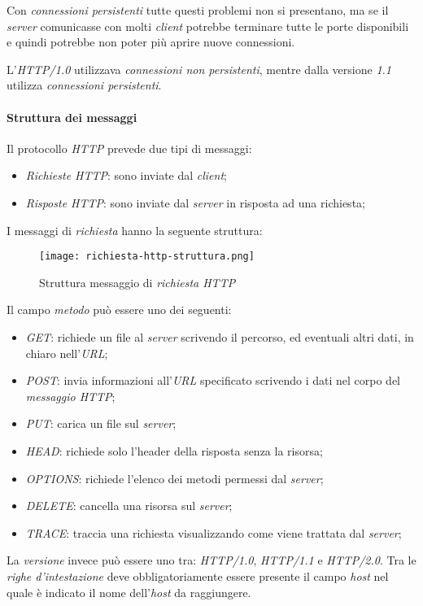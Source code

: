 Con \emph{connessioni persistenti} tutte questi problemi non si presentano, ma
se il \emph{server} comunicasse con molti \emph{client} potrebbe terminare tutte le
porte disponibili e quindi potrebbe non poter più aprire nuove connessioni.

L'\emph{HTTP/1.0} utilizzava \emph{connessioni non persistenti}, mentre
dalla versione \emph{1.1} utilizza \emph{connessioni persistenti}.

\paragraph{Struttura dei messaggi}
Il protocollo \emph{HTTP} prevede due tipi di messaggi:
\begin{itemize}
    \item \emph{Richieste HTTP}: sono inviate dal \emph{client};
    \item \emph{Risposte HTTP}: sono inviate dal \emph{server} in risposta ad
    una richiesta;
\end{itemize}
I messaggi di \emph{richiesta} hanno la seguente struttura:
\begin{figure}[h!]
    \centering
    \texttt{[image: richiesta-http-struttura.png]}
    \caption{Struttura messaggio di \emph{richiesta HTTP}}
\end{figure}

\noindent Il campo \emph{metodo} può essere uno dei seguenti:
\begin{itemize}
    \item \emph{GET}: richiede un file al \emph{server} scrivendo il percorso, ed
    eventuali altri dati, in chiaro nell’\emph{URL};
    \item \emph{POST}: invia informazioni all’\emph{URL} specificato scrivendo
    i dati nel corpo del \emph{messaggio HTTP};
    \item \emph{PUT}: carica un file sul \emph{server};
    \item \emph{HEAD}: richiede solo l’header della risposta senza la risorsa;
    \item \emph{OPTIONS}: richiede l’elenco dei metodi permessi dal \emph{server};
    \item \emph{DELETE}: cancella una risorsa sul \emph{server};
    \item \emph{TRACE}: traccia una richiesta visualizzando come viene trattata
    dal \emph{server};    
\end{itemize}
La \emph{versione} invece può essere uno tra: \emph{HTTP/1.0}, \emph{HTTP/1.1} e
\emph{HTTP/2.0}. Tra le \emph{righe d'intestazione} deve obbligatoriamente
essere presente il campo \emph{host} nel quale è indicato il nome dell'\emph{host}
da raggiungere.

